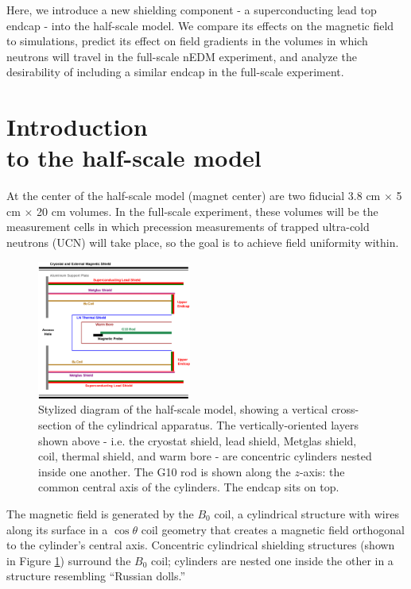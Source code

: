 \documentclass[twocolumn,aps,prb,citeautoscript]{revtex4-1}
\begin{document}
Here, we introduce a new shielding component - a superconducting lead top endcap - into the half-scale model. We
compare its effects on the magnetic field to simulations, predict its effect on field gradients in the volumes in
which neutrons will travel in the full-scale nEDM experiment, and analyze the desirability of including a similar
endcap in the full-scale experiment.

\section{Introduction \\ to the half-scale model}

At the center of the half-scale model (magnet center)
are two fiducial 3.8 cm $\times$ 5 cm $\times$ 20 cm volumes.
In the full-scale experiment, these volumes will be the measurement cells in which
precession measurements of trapped ultra-cold neutrons (UCN) will take
place, so the goal is to achieve field uniformity within.

\begin{figure}
    \includegraphics[angle=90, width=0.45\textwidth]{figures/structure.eps}
    \caption{\label{fig:structure}Stylized diagram of the half-scale model, showing a vertical
    cross-section of the cylindrical apparatus. The vertically-oriented layers shown above
    - i.e. the cryostat shield, lead shield, Metglas shield, coil, thermal shield, and warm bore -
    are concentric cylinders nested inside one another.
    The G10 rod is shown along the $z$-axis: the common central axis of the cylinders. The endcap
    sits on top.}
\end{figure}

The magnetic field is generated by the $B_0$ coil, a cylindrical structure with wires along its
surface in a $\cos\theta$ coil geometry that creates a magnetic field orthogonal to the cylinder's
central axis\cite{coil}. Concentric cylindrical shielding structures (shown in Figure \ref{fig:structure})
surround the $B_0$ coil; cylinders are nested one inside the other in a structure resembling ``Russian dolls.''
\end{document}
